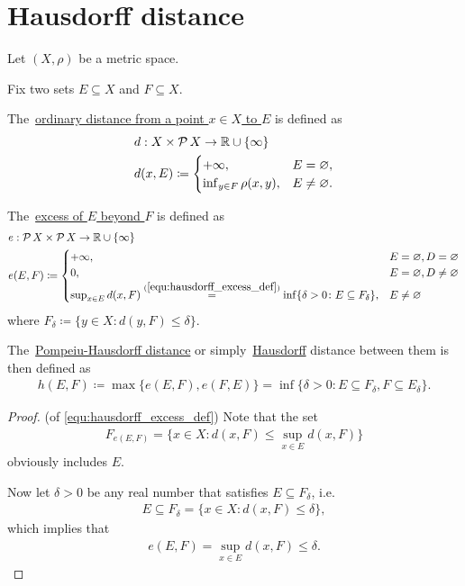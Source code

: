 \section{Hausdorff distance}\label{sec:hausdorff_distance}

Let $(X, \rho)$ be a metric space.

\begin{definition}\label{def:hausdorff_distance}\cite[144]{Dontchev2014}
  Fix two sets $E \subseteq X$ and $F \subseteq X$.

  The~\uline{ordinary distance from a point $x \in X$ to $E$} is defined as
  \begin{align*}
    &d: X \times \operatorname{\mathcal P} X \to \mathbb R \cup \{ \infty \}
    \\
    &d(x, E) \coloneqq \begin{cases}
      +\infty, &E = \varnothing, \\
      \inf_{y \in F} \rho(x, y), &E \neq \varnothing.
    \end{cases}
  \end{align*}

  The~\uline{excess of $E$ beyond $F$} is defined as
  \begin{align}\label{equ:hausdorff_excess_def}
    &e: \Power X \times \Power X \to \BB{R} \cup \{ \infty \} \\ \nonumber
    &e(E, F) \coloneqq \begin{cases}
      +\infty, &E = \varnothing, D = \varnothing \\
      0, &E = \varnothing, D \neq \varnothing \\
      \sup_{x \in E} d(x, F) \stackrel{(\ref{equ:hausdorff_excess_def})}{=} \inf \{\delta > 0 \colon E \subseteq F_\delta \}, &E \neq \varnothing \nonumber\refstepcounter{equation}
    \end{cases}
  \end{align}
  where $F_\delta \coloneqq \{ y \in X \colon d(y, F) \leq \delta \}$.

  The~\uline{Pompeiu-Hausdorff distance} or simply~\uline{Hausdorff} distance between them is then defined as
  \begin{align*}
    h(E, F) \coloneqq \max\{ e(E, F), e(F, E) \} = \inf \{\delta > 0 \colon E \subseteq F_\delta, F \subseteq E_\delta \}.
  \end{align*}
\end{definition}
\begin{proof}(of \ref{equ:hausdorff_excess_def})
  Note that the set
  \begin{align*}
    F_{e(E, F)} = \{ x \in X \colon d(x, F) \leq \sup_{x \in E} d(x, F) \}
  \end{align*}
  obviously includes $E$.

  Now let $\delta > 0$ be any real number that satisfies $E \subseteq F_\delta$, i.e.
  \begin{align*}
    E \subseteq F_\delta = \{ x \in X \colon d(x, F) \leq \delta \},
  \end{align*}
  which implies that
  \begin{align*}
    e(E, F) = \sup_{x \in E} d(x, F) \leq \delta.
  \end{align*}
\end{proof}

